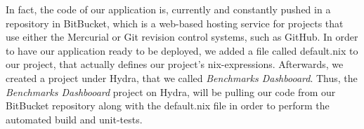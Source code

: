 In fact, the code of our application is, currently and constantly pushed in a
repository in BitBucket, which is a web-based hosting service for projects that
use either the Mercurial or Git revision control systems, such as GitHub. In
order to have our application ready to be deployed, we added a file called
default.nix to our project, that actually defines our project’s nix-expressions.
Afterwards, we created a project under Hydra, that we called \emph{Benchmarks Dashbooard}. Thus,
the \emph{Benchmarks Dashbooard} project on Hydra, will be pulling our code from our BitBucket
repository along with the default.nix file in order to perform the automated
build and unit-tests.
